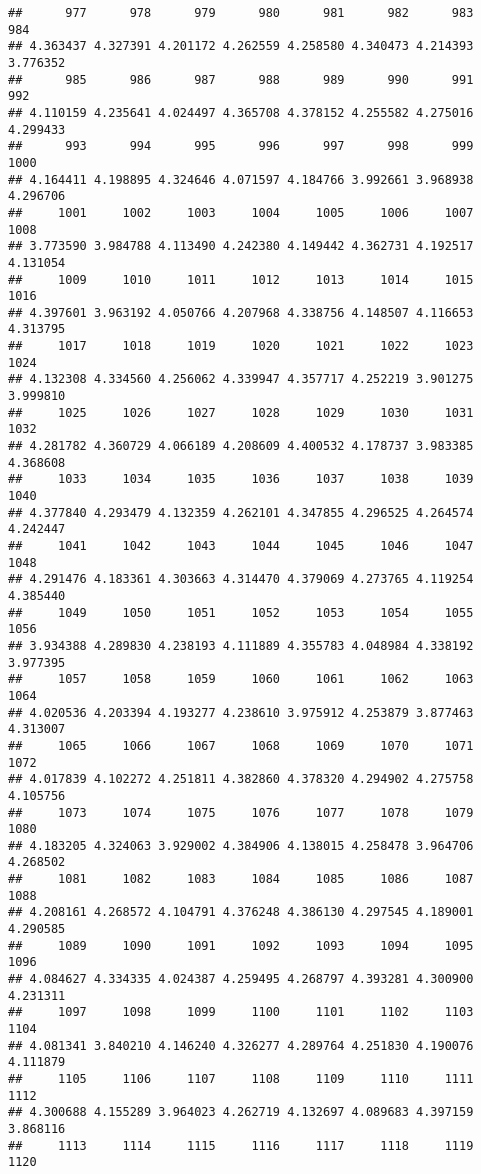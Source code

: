 \documentclass[
]{article}
\begin{document}
\begin{verbatim}
##      977      978      979      980      981      982      983      984 
## 4.363437 4.327391 4.201172 4.262559 4.258580 4.340473 4.214393 3.776352 
##      985      986      987      988      989      990      991      992 
## 4.110159 4.235641 4.024497 4.365708 4.378152 4.255582 4.275016 4.299433 
##      993      994      995      996      997      998      999     1000 
## 4.164411 4.198895 4.324646 4.071597 4.184766 3.992661 3.968938 4.296706 
##     1001     1002     1003     1004     1005     1006     1007     1008 
## 3.773590 3.984788 4.113490 4.242380 4.149442 4.362731 4.192517 4.131054 
##     1009     1010     1011     1012     1013     1014     1015     1016 
## 4.397601 3.963192 4.050766 4.207968 4.338756 4.148507 4.116653 4.313795 
##     1017     1018     1019     1020     1021     1022     1023     1024 
## 4.132308 4.334560 4.256062 4.339947 4.357717 4.252219 3.901275 3.999810 
##     1025     1026     1027     1028     1029     1030     1031     1032 
## 4.281782 4.360729 4.066189 4.208609 4.400532 4.178737 3.983385 4.368608 
##     1033     1034     1035     1036     1037     1038     1039     1040 
## 4.377840 4.293479 4.132359 4.262101 4.347855 4.296525 4.264574 4.242447 
##     1041     1042     1043     1044     1045     1046     1047     1048 
## 4.291476 4.183361 4.303663 4.314470 4.379069 4.273765 4.119254 4.385440 
##     1049     1050     1051     1052     1053     1054     1055     1056 
## 3.934388 4.289830 4.238193 4.111889 4.355783 4.048984 4.338192 3.977395 
##     1057     1058     1059     1060     1061     1062     1063     1064 
## 4.020536 4.203394 4.193277 4.238610 3.975912 4.253879 3.877463 4.313007 
##     1065     1066     1067     1068     1069     1070     1071     1072 
## 4.017839 4.102272 4.251811 4.382860 4.378320 4.294902 4.275758 4.105756 
##     1073     1074     1075     1076     1077     1078     1079     1080 
## 4.183205 4.324063 3.929002 4.384906 4.138015 4.258478 3.964706 4.268502 
##     1081     1082     1083     1084     1085     1086     1087     1088 
## 4.208161 4.268572 4.104791 4.376248 4.386130 4.297545 4.189001 4.290585 
##     1089     1090     1091     1092     1093     1094     1095     1096 
## 4.084627 4.334335 4.024387 4.259495 4.268797 4.393281 4.300900 4.231311 
##     1097     1098     1099     1100     1101     1102     1103     1104 
## 4.081341 3.840210 4.146240 4.326277 4.289764 4.251830 4.190076 4.111879 
##     1105     1106     1107     1108     1109     1110     1111     1112 
## 4.300688 4.155289 3.964023 4.262719 4.132697 4.089683 4.397159 3.868116 
##     1113     1114     1115     1116     1117     1118     1119     1120 

\end{verbatim}
\end{document}
